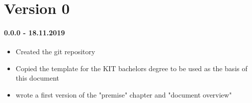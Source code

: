 
\section*{Version 0}

\paragraph{0.0.0 - 18.11.2019}

\begin{itemize}
\item Created the git repository
\item Copied the template for the KIT bachelors degree to be used as the basis of this document
\item wrote a first version of the "premise" chapter and "document overview"
\end{itemize}